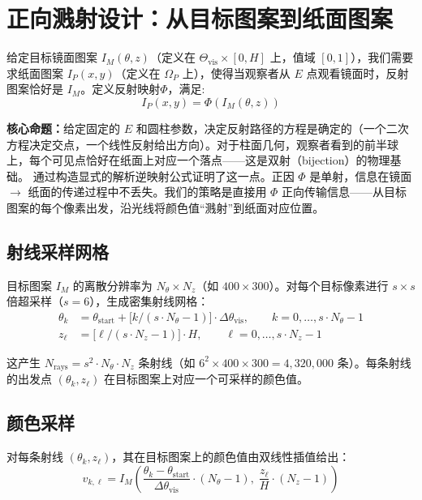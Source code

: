 \documentclass[12pt,a4paper]{ctexart}
\begin{document}
\section{正向溅射设计：从目标图案到纸面图案}

给定目标镜面图案 $I_M(\theta,z)$（定义在 $\Theta_{\mathrm{vis}}\times[0,H]$ 上，值域 $[0,1]$），我们需要求纸面图案 $I_P(x,y)$（定义在 $\Omega_P$ 上），使得当观察者从 $E$ 点观看镜面时，反射图案恰好是 $I_M$。定义反射映射$\Phi$，满足:
\begin{equation}
I_P(x,y)=\Phi(I_M(\theta,z))
\end{equation}

\textbf{核心命题：}给定固定的 $E$ 和圆柱参数，决定反射路径的方程是确定的（一个二次方程决定交点，一个线性反射给出方向）。对于柱面几何，观察者看到的前半球上，每个可见点恰好在纸面上对应一个落点——这是双射（bijection）的物理基础。 通过构造显式的解析逆映射公式证明了这一点。正因 $\Phi$ 是单射，信息在镜面 $\to$ 纸面的传递过程中不丢失。我们的策略是直接用 $\Phi$ 正向传输信息——从目标图案的每个像素出发，沿光线将颜色值``溅射''到纸面对应位置。

\subsection{射线采样网格}

目标图案 $I_M$ 的离散分辨率为 $N_\theta\times N_z$（如 $400\times300$）。对每个目标像素进行 $s\times s$ 倍超采样（$s=6$），生成密集射线网格：
\begin{align}
    \theta_k &= \theta_{\mathrm{start}} + \bigl[k/(s\cdot N_\theta-1)\bigr]\cdot\Delta\theta_{\mathrm{vis}}, \qquad k=0,\dots,s\cdot N_\theta-1 \label{eq:theta_sample}\\
    z_\ell   &= \bigl[\ell/(s\cdot N_z-1)\bigr]\cdot H, \qquad \ell=0,\dots,s\cdot N_z-1 \label{eq:z_sample}
\end{align}

这产生 $N_{\mathrm{rays}} = s^2\cdot N_\theta\cdot N_z$ 条射线（如 $6^2\times400\times300=4{,}320{,}000$ 条）。每条射线的出发点 $(\theta_k, z_\ell)$ 在目标图案上对应一个可采样的颜色值。

\subsection{颜色采样}

对每条射线 $(\theta_k, z_\ell)$，其在目标图案上的颜色值由双线性插值给出：
\begin{equation}
    v_{k,\ell} = I_M\!\left( \frac{\theta_k-\theta_{\mathrm{start}}}{\Delta\theta_{\mathrm{vis}}}\cdot(N_\theta-1),\;
                              \frac{z_\ell}{H}\cdot(N_z-1) \right)
\end{equation}
\end{document}
